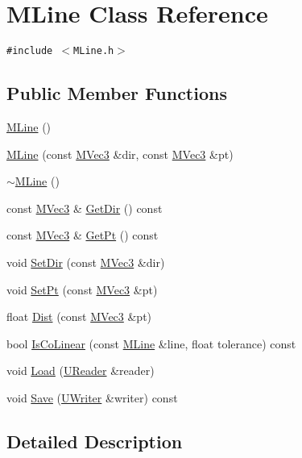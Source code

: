 \hypertarget{class_m_line}{
\section{MLine Class Reference}
\label{class_m_line}
}
{\tt \#include $<$MLine.h$>$}

\subsection*{Public Member Functions}
\begin{CompactItemize}
\item 
\hyperlink{class_m_line_a023c0040568a41cb63a3bdfc3600b24}{MLine} ()
\item 
\hyperlink{class_m_line_178a9637e3753f559c04ed0abcc74788}{MLine} (const \hyperlink{class_m_vec3}{MVec3} \&dir, const \hyperlink{class_m_vec3}{MVec3} \&pt)
\item 
\hyperlink{class_m_line_5d2d469c23838340ffa0acd84b255e44}{$\sim$MLine} ()
\item 
const \hyperlink{class_m_vec3}{MVec3} \& \hyperlink{class_m_line_376cbeab71b3d281f7bde73b610ee820}{GetDir} () const 
\item 
const \hyperlink{class_m_vec3}{MVec3} \& \hyperlink{class_m_line_218c7222844e18938f4f928fbb15135a}{GetPt} () const 
\item 
void \hyperlink{class_m_line_7b3fba942749f374c98ffee3472f7162}{SetDir} (const \hyperlink{class_m_vec3}{MVec3} \&dir)
\item 
void \hyperlink{class_m_line_a3f996dc4653721f464c47007d623370}{SetPt} (const \hyperlink{class_m_vec3}{MVec3} \&pt)
\item 
float \hyperlink{class_m_line_294f48086b09db9d67a8209776c8ee85}{Dist} (const \hyperlink{class_m_vec3}{MVec3} \&pt)
\item 
bool \hyperlink{class_m_line_2efbe33d2c8a438be9fb6ea44368165e}{IsCoLinear} (const \hyperlink{class_m_line}{MLine} \&line, float tolerance) const 
\item 
void \hyperlink{class_m_line_b0eb935747cb7dda550bfdcb4f67c535}{Load} (\hyperlink{class_u_reader}{UReader} \&reader)
\item 
void \hyperlink{class_m_line_fb250ec3be9ab81f80de8b23d9859106}{Save} (\hyperlink{class_u_writer}{UWriter} \&writer) const 
\end{CompactItemize}


\subsection{Detailed Description}


